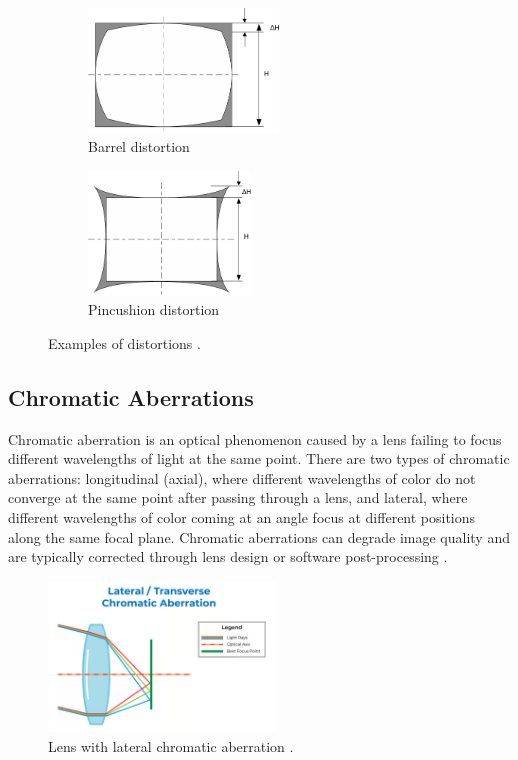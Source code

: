 \begin{figure}[htbp]
  \centering
  \begin{subfigure}[b]{0.45\textwidth}
    \centering
    \includegraphics[height=3.3cm]{Images/barrel_distortion.png}
    \caption{Barrel distortion}
    \label{fig:barrel}
  \end{subfigure}
  \hfill
  \begin{subfigure}[b]{0.45\textwidth}
    \centering
    \includegraphics[height=3.3cm]{Images/pincushion_distortion.png}
    \caption{Pincushion distortion}
    \label{fig:pincushion}
  \end{subfigure}
  \caption{Examples of distortions \cite{distortions}.}
  \label{fig:distortions}
\end{figure}

\subsection{Chromatic Aberrations}
Chromatic aberration is an optical phenomenon caused by a lens failing to focus different wavelengths of light at the same point. There are two types of chromatic aberrations: longitudinal (axial), where different wavelengths of color do not converge at the same point after passing through a lens, and lateral, where different wavelengths of color coming at an angle focus at different positions along the same focal plane. Chromatic aberrations can degrade image quality and are typically corrected through lens design or software post-processing \cite{ChromaticAberation}.

\begin{figure}[h]
\centering
\includegraphics[height=4cm]{Images/chromatic_aberation.png}
\caption{Lens with lateral chromatic aberration \cite{ChromaticAberation}.}
\label{fig:chrom_ab}
\end{figure}

